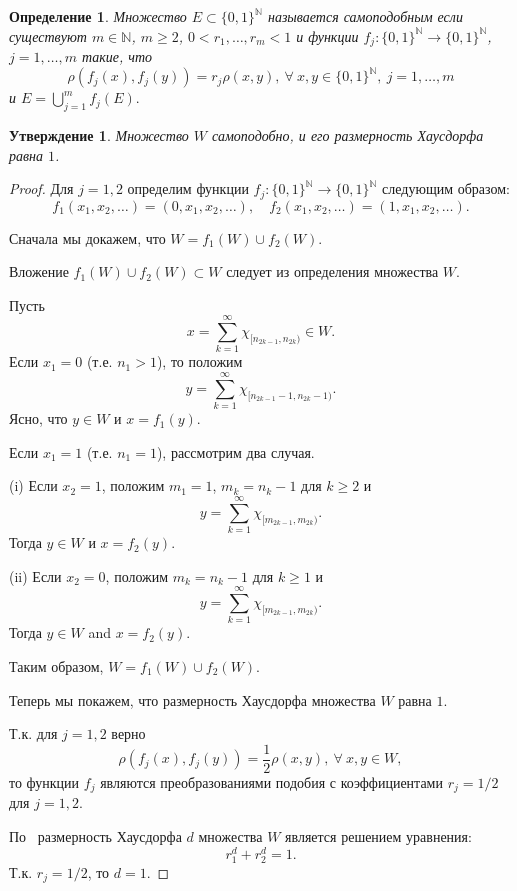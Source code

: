 \documentclass[12pt]{article}
\newtheorem{prop}[thm]{Утверждение}
\newtheorem{dfn}[thm]{Определение}
\def\N{{\mathbb{N}}}
\begin{document}
\begin{dfn}
Множество $E\subset\{0,1\}^\N$ называется самоподобным если существуют $m\in\N$, $m\ge2$, $0< r_1, \dots, r_m<1$ и функции $f_j : \{0,1\}^\N \to \{0,1\}^\N$, $j=1,\dots, m$ такие, что 
$$\rho(f_j(x), f_j(y)) = r_j \rho(x,y), \ \forall \ x,y \in \{0,1\}^\N, \ j=1,\dots, m$$
и $E=\bigcup_{j=1}^m f_j(E).$
\end{dfn}


\begin{prop}
Множество $W$ самоподобно, и его размерность Хаусдорфа равна $1$.
\end{prop}

\begin{proof}
Для $j=1,2$ определим функции $f_j : \{0,1\}^\N \to \{0,1\}^\N$ следующим образом:
$$f_1(x_1, x_2, \dots)=(0, x_1, x_2, \dots), \quad f_2(x_1, x_2, \dots)=(1, x_1, x_2, \dots).$$

Сначала мы докажем, что $W=f_1(W)\cup f_2(W).$

Вложение $f_1(W)\cup f_2(W) \subset W$ следует из определения множества $W$.

Пусть
$$x=\sum_{k=1}^\infty \chi_{[n_{2k-1},n_{2k})}\in W.$$
 Если $x_1=0$ (т.е. $n_1>1$), то положим
 $$y=\sum_{k=1}^\infty \chi_{[n_{2k-1}-1,n_{2k}-1)}.$$
 Ясно, что $y\in W$ и $x=f_1(y)$.

 Если $x_1=1$ (т.е. $n_1=1$), рассмотрим два случая.

 (i) Если $x_2=1$, положим $m_1=1$, $m_k=n_k-1$ для $k\ge2$ и
 $$y=\sum_{k=1}^\infty \chi_{[m_{2k-1},m_{2k})}.$$
 Тогда $y\in W$ и $x=f_2(y)$.

 (ii) Если $x_2=0$, положим $m_k=n_k-1$ для $k\ge1$ и
 $$y=\sum_{k=1}^\infty \chi_{[m_{2k-1},m_{2k})}.$$
 Тогда $y\in W$ and $x=f_2(y)$.

 Таким образом, $W=f_1(W)\cup f_2(W).$

 Теперь мы покажем, что размерность Хаусдорфа множества $W$ равна $1$.

Т.к. для $j=1,2$ верно
 $$\rho(f_j(x),f_j(y))=\frac12\rho(x,y), \ \forall \ x, y \in W,$$
 то функции $f_j$ являются преобразованиями подобия с коэффициентами $r_j=1/2$ для $j=1,2$.


По~\cite[Теорема 9.3]{Edgar} размерность Хаусдорфа $d$ множества $W$ является решением уравнения:
$$ r_1^d+r_2^d=1.$$
Т.к. $r_j=1/2$, то
$d=1.$
\end{proof}
\end{document}
